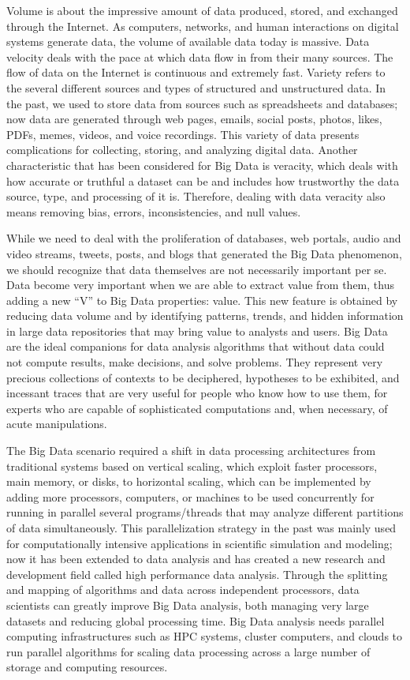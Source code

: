 Volume is about the impressive amount of data produced, stored, and exchanged through the Internet. As computers, networks, and human interactions on digital systems generate data, the volume of available data today is massive. Data velocity deals with the pace at which data flow in from their many sources. The flow of data on the Internet is continuous and extremely fast. Variety refers to the several different sources and types of structured and unstructured data. In the past, we used to store data from sources such as spreadsheets and databases; now data are generated through web pages, emails, social posts, photos, likes, PDFs, memes, videos, and voice recordings. This variety of data presents complications for collecting, storing, and analyzing digital data. Another characteristic that has been considered for Big Data is veracity, which deals with how accurate or truthful a dataset can be and includes how trustworthy the data source, type, and processing of it is. Therefore, dealing with data veracity also means removing bias, errors, inconsistencies, and null values.

While we need to deal with the proliferation of databases, web portals, audio and video streams, tweets, posts, and blogs that generated the Big Data phenomenon, we should recognize that data themselves are not necessarily important per se. Data become very important when we are able to extract value from them, thus adding a new ``V'' to Big Data properties: value. This new feature is obtained by reducing data volume and by identifying patterns, trends, and hidden information in large data repositories that may bring value to analysts and users. Big Data are the ideal companions for data analysis algorithms that without data could not compute results, make decisions, and solve problems. They represent very precious collections of contexts to be deciphered, hypotheses to be exhibited, and incessant traces that are very useful for people who know how to use them, for experts who are capable of sophisticated computations and, when necessary, of acute manipulations.

The Big Data scenario required a shift in data processing architectures from traditional systems based on vertical scaling, which exploit faster processors, main memory, or disks, to horizontal scaling, which can be implemented by adding more processors, computers, or machines to be used concurrently for running in parallel several programs/{\allowbreak}threads that may analyze different partitions of data simultaneously. This parallelization strategy in the past was mainly used for computationally intensive applications in scientific simulation and modeling; now it has been extended to data analysis and has created a new research and development field called high performance data analysis. Through the splitting and mapping of algorithms and data across independent processors, data scientists can greatly improve Big Data analysis, both managing very large datasets and reducing global processing time. Big Data analysis needs parallel computing infrastructures such as HPC systems, cluster computers, and clouds to run parallel algorithms for scaling data processing across a large number of storage and computing resources.

